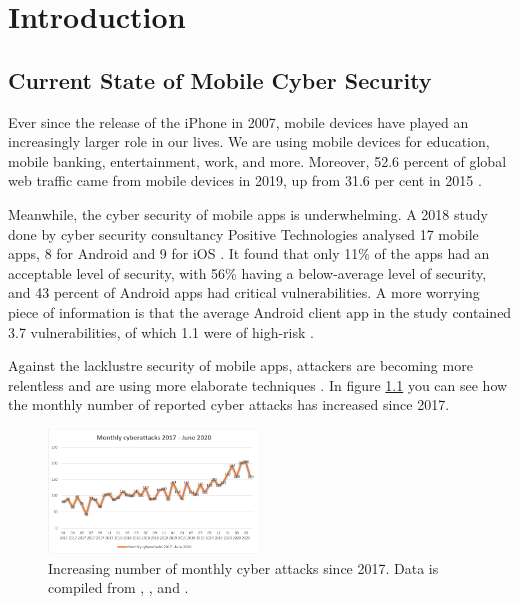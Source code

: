 \chapter{Introduction}
	\label{chap:intro}
	
	\section{Current State of Mobile Cyber Security}
		\label{sec:intro_motivation} 
		
		Ever since the release of the iPhone in 2007, mobile devices have played an increasingly larger role in our lives. We are using mobile devices for education, mobile banking, entertainment, work, and more. Moreover, 52.6 percent of global web traffic came from mobile devices in 2019, up from 31.6 per cent in 2015 \cite{statista_mobile_web_traffic}. 
		
		Meanwhile, the cyber security of mobile apps is underwhelming. A 2018 study done by cyber security consultancy Positive Technologies analysed 17 mobile apps, 8 for Android and 9 for iOS \cite{pt_mobile_apps_2019}. It found that only 11\% of the apps had an acceptable level of security, with 56\% having a below-average level of security, and 43 percent of Android apps had critical vulnerabilities. A more worrying piece of information is that the average Android client app in the study contained 3.7 vulnerabilities, of which 1.1 were of high-risk \cite{pt_mobile_apps_2019}.
		
		Against the lacklustre security of mobile apps, attackers are becoming more relentless and are using more elaborate techniques \cite{pt_threatscape_2018}. In figure \ref{fig:no_attacks_evolution} you can see how the monthly number of reported cyber attacks has increased since 2017.
		
		\begin{figure}[h]
            \centering
            \includegraphics[width=0.5\textwidth]{graphics/threatscape_chart.PNG}
            \caption{Increasing number of monthly cyber attacks since 2017. Data is compiled from \cite{pt_threatscape_2018}, \cite{pt_threatscape_2019}, \cite{pt_threatscape_2020} and              \cite{pt_threatscape_2020q2}.}
            \label{fig:no_attacks_evolution}
        \end{figure}
		
